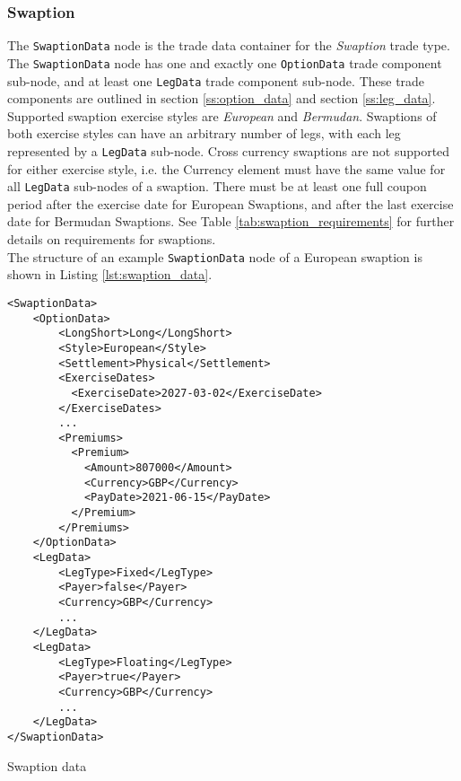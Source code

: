 \subsubsection{Swaption}
\label{ss:swaption} 

The \lstinline!SwaptionData!  node is the trade data container for the \emph{Swaption} trade type. The \lstinline!SwaptionData!
node has one and exactly one \lstinline!OptionData! trade component sub-node, and at least one \lstinline!LegData! trade
component sub-node.  These trade components are outlined in section \ref{ss:option_data} and section
\ref{ss:leg_data}.\\
\vspace{5mm}
Supported swaption exercise styles are \emph{European} and \emph{Bermudan}. Swaptions of both exercise styles can have an arbitrary number of legs, with
each leg represented by a \lstinline!LegData! sub-node.  Cross currency swaptions are not supported for either exercise style, i.e. the Currency element must
have the same value for all \lstinline!LegData! sub-nodes of a swaption. There must be at least one full coupon period after the exercise date for European 
Swaptions, and after the last exercise date for Bermudan Swaptions. See Table \ref{tab:swaption_requirements} for further details on requirements for
 swaptions.\\
\vspace{5mm}
The structure of an example \lstinline!SwaptionData!  node of a European swaption is shown in Listing
\ref{lst:swaption_data}.

\begin{listing}[H]
\begin{verbatim}
<SwaptionData>
    <OptionData>
        <LongShort>Long</LongShort>
        <Style>European</Style>
        <Settlement>Physical</Settlement>
        <ExerciseDates>
          <ExerciseDate>2027-03-02</ExerciseDate>
        </ExerciseDates>
        ...
        <Premiums>
          <Premium>
            <Amount>807000</Amount>
            <Currency>GBP</Currency>
            <PayDate>2021-06-15</PayDate>
          </Premium>
        </Premiums>
    </OptionData>
    <LegData>
        <LegType>Fixed</LegType>
        <Payer>false</Payer>    
        <Currency>GBP</Currency>
        ...
    </LegData>
    <LegData>
        <LegType>Floating</LegType>
        <Payer>true</Payer>     
        <Currency>GBP</Currency>
        ...
    </LegData>
</SwaptionData>
\end{verbatim}
\caption{Swaption data}
\label{lst:swaption_data}
\end{listing}

